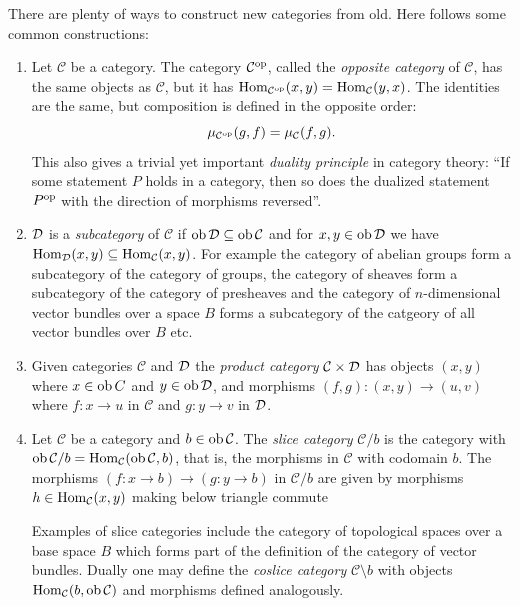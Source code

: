 \documentclass[a4paper,openany]{scrbook}
\renewcommand{\C}{\mathcal C}
\begin{document}
\begin{example}
There are plenty of ways to construct new categories from old. Here follows some common constructions:
\begin{enumerate}[label=\alph*)]
\item Let $\C$ be a category. The category $\C^\op$, called the \emph{opposite category} of $\C$, has the same objects as $\C$, but it has $\Hom_{\C^\op}(x,y) = \Hom_\C(y,x)$. The identities are the same, but composition is defined in the opposite order:
\[
\mu_{\C^\op}(g,f) = \mu_\C(f,g).
\]
This also gives a trivial yet important \emph{duality principle} in category theory:
``If some statement $P$ holds in a category, then so does the dualized statement $P^{{\operatorname{op}}}$ with the direction of morphisms reversed''.
\item $\mathcal D$ is a \emph{subcategory} of $\C$ if $\ob \D \subseteq \ob \C$ and for $x,y \in \operatorname{ob} \mathcal D$ we have $\Hom_{\D}(x,y) \subseteq \Hom_{\C}(x,y)$. For example the category of abelian groups form a subcategory of the category of groups, the category of sheaves form a subcategory of the category of presheaves and the category of $n$-dimensional vector bundles over a space $B$ forms a subcategory of the catgeory of all vector bundles over $B$ etc. 
\item Given categories $\C$ and $\mathcal D$ the \emph{product category} $\C \times \D$ has objects $(x,y)$ where $x \in \operatorname{ob} C$ and $y \in \operatorname{ob} \mathcal D$, and morphisms $(f,g):(x,y) \to (u,v)$ where $f:x \to u$ in $\C$ and $g:y \to v$ in $\mathcal D$.
\item Let $\C$ be a category and $b \in \ob \C$. The \emph{slice category} $\C / b$ is the category with $\ob \C/b = \Hom_{\C}(\ob \C, b)$, that is, the morphisms in $\C$ with codomain $b$. The morphisms $(f:x \to b) \to (g:y \to b)$ in $\C/b$ are given by morphisms $h \in \Hom_{\C}(x,y)$ making below triangle commute
\begin{center}
\end{center}
Examples of slice categories include the category of topological spaces over a base space $B$ which forms part of the definition of the category of vector bundles. Dually one may define the \emph{coslice category} $\C \setminus b$ with objects $\Hom_{\C}(b, \ob \C)$ and morphisms defined analogously. 
\end{enumerate}
\end{example}
\end{document}
